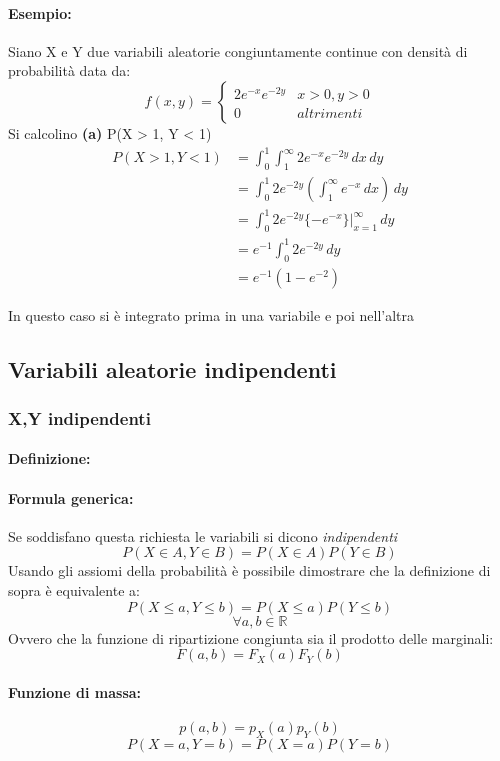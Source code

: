 \documentclass[]{article}
\newcommand{\definizione}{\paragraph{Definizione:}}
\newcommand{\formula}{\paragraph{Formula generica:}}
\begin{document}
    \paragraph{Esempio:} Siano X e Y due variabili aleatorie congiuntamente continue con densità
    di probabilità data da:
    \begin{equation*}
        f(x,y) =
        \begin{cases}
            2e^{-x} e^{-2y} & x > 0, y > 0 \\
            0 & altrimenti
        \end{cases}
    \end{equation*}
    Si calcolino \textbf{(a)} P(X > 1, Y < 1)
    \begin{equation*}
        \begin{split}
            P(X > 1, Y < 1) & = \int_{0}^{1} \int_{1}^{\infty} 2e^{-x} e^{-2y} \, dx \, dy \\
            & = \int_{0}^{1} 2e^{-2y} (\int_{1}^{\infty} e^{-x} \, dx) \, dy \\
            & = \int_{0}^{1} 2e^{-2y}\{ -e^{-x}\} \rvert_{x=1}^{\infty} \, dy \\
            & = e^{-1} \int_{0}^{1} 2e^{-2y} \, dy \\
            & = e^{-1}(1 - e^{-2})
        \end{split}
    \end{equation*}
    \centerline{In questo caso si è integrato prima in una variabile e poi nell'altra}

    \subsection{Variabili aleatorie indipendenti}
    \subsubsection{X,Y indipendenti}
    \definizione
    \formula Se soddisfano questa richiesta le variabili si dicono \textit{indipendenti} 
    \[ P(X \in A, Y \in B) = P(X \in A) P(Y \in B)\]
    Usando gli assiomi della probabilità è possibile dimostrare che la definizione di sopra è equivalente a:
    \[ P(X \leq a, Y \leq b) = P(X \leq a) P(Y \leq b)\]
    \[ \forall a,b \in \mathbb{R} \]
    \linebreak[3]
    Ovvero che la funzione di ripartizione congiunta sia il prodotto delle marginali:
    \[ F(a,b) = F_X(a) F_Y(b)\]
    \paragraph{Funzione di massa:}
    \[ p(a,b) = p_X(a) p_Y(b) \]
    \[ P(X=a, Y=b) = P(X=a) P(Y=b)\]
\end{document}
